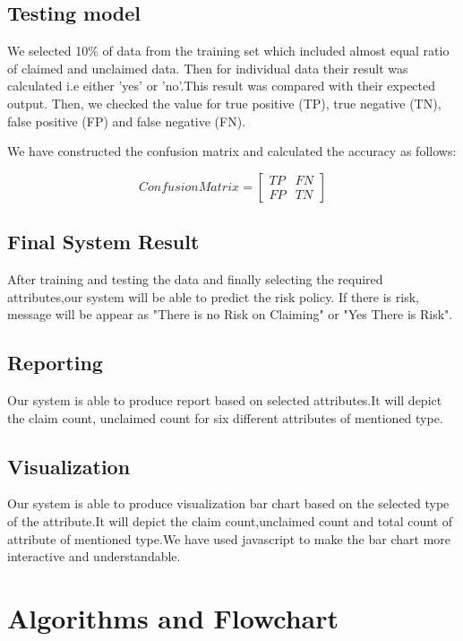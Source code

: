 \subsection{Testing model}
We selected 10\% of data from the training set which included almost equal ratio of claimed and unclaimed data. Then for individual data their result was calculated i.e either 'yes' or 'no'.This result was compared with their expected output. Then, we checked the value for true positive (TP), true negative (TN), false positive (FP) and false negative (FN).
\par We have constructed the confusion matrix and calculated the accuracy as follows:
\par
$$
 Confusion Matrix =
\begin{bmatrix}
TP & FN \\
FP & TN
\end{bmatrix}
$$
\subsection{Final System Result}
After training and testing the data and finally selecting the required attributes,our system will be able to predict the risk policy. If there is risk, message will be appear as "There is no Risk on Claiming" or "Yes There is Risk".
\subsection{Reporting}
Our system is able to produce report based on selected attributes.It will depict the claim count, unclaimed count for six different attributes of mentioned type.

\subsection{Visualization}
Our system is able to produce visualization bar chart based on the selected type of the attribute.It will depict the claim count,unclaimed count and total count of attribute of mentioned type.We have used javascript to make the bar chart more interactive and understandable.



\section{Algorithms and Flowchart}
